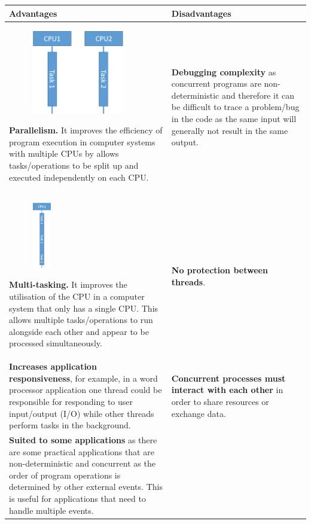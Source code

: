 \documentclass[a4paper]{systems-software}
\begin{document}
\begin{longtabu} to \textwidth {|X[1,l]|X[1,l]|}
    \hline
    \textbf{Advantages} & \textbf{Disadvantages}
    \\ \hline
    \begin{figure}
		\includegraphics[width=4cm]{images/chapter-3/parallelism.png}
	\end{figure} 
    \textbf{Parallelism.} It improves the efficiency of program execution in computer systems with multiple CPUs by allows tasks/operations to be split up and executed independently on each CPU.
    &
    \textbf{Debugging complexity} as concurrent programs are non-deterministic and therefore it can be difficult to trace a problem/bug in the code as the same input will generally not result in the same output.  
    \\ \hline
    \begin{figure}
		\includegraphics[width=0.8cm]{images/chapter-3/multi-tasking.png}
	\end{figure}
    \textbf{Multi-tasking.} It improves the utilisation of the CPU in a computer system that only has a single CPU. This allows multiple tasks/operations to run alongside each other and appear to be processed simultaneously.
    &
    \textbf{No protection between threads}.
    \\ \hline
    \textbf{Increases application responsiveness}, for example, in a word processor application one thread could be responsible for responding to user input/output (I/O) while other threads perform tasks in the background.
    &
    \textbf{Concurrent processes must interact with each other} in order to share resources or exchange data.
    \\ \hline
    \textbf{Suited to some applications} as there are some practical applications that are non-deterministic and concurrent as the order of program operations is determined by other external events. This is useful for applications that need to handle multiple events.

\end{longtabu}
\end{document}

